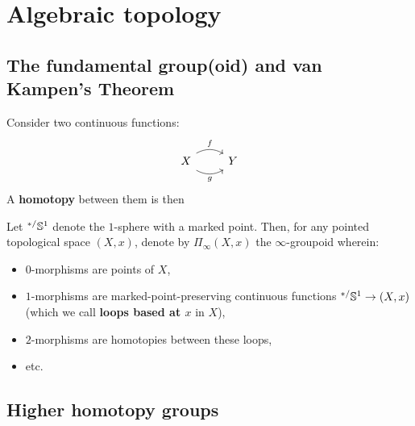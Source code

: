 \section{Algebraic topology}
    \subsection{The fundamental group(oid) and van Kampen's Theorem}
        \begin{definition}[Homotopies] \label{def: homotopies}
            Consider two continuous functions:
                $$
                    \begin{tikzcd}
                        X \arrow[r, "g"', bend right, shift right] \arrow[r, "f", bend left, shift left] & Y
                    \end{tikzcd}
                $$
            A \textbf{homotopy} between them is then  
        \end{definition}
    
        \begin{definition} \label{def: the_fundamental_groupoid}
            Let ${}^{*/}\mathbb{S}^1$ denote the $1$-sphere with a marked point. Then, for any pointed topological space $(X, x)$, denote by $\Pi_{\infty}(X, x)$ the $\infty$-groupoid wherein:
                \begin{itemize}
                    \item $0$-morphisms are points of $X$,
                    \item $1$-morphisms are marked-point-preserving continuous functions ${}^{*/}\mathbb{S}^1 \to (X, x)$ (which we call \textbf{loops based at $x$} in $X$),
                    \item $2$-morphisms are homotopies between these loops,
                    \item etc.
                \end{itemize}
        \end{definition}
    
    \subsection{Higher homotopy groups}
